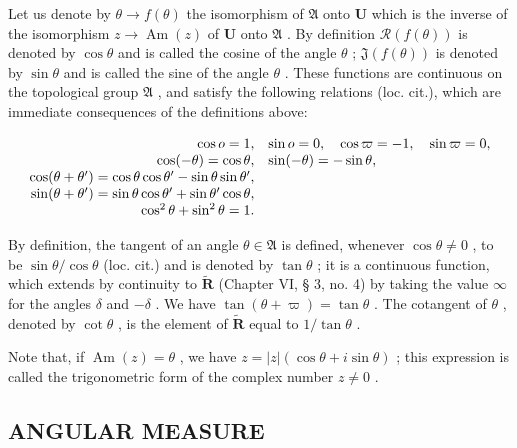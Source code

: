 Let us denote by \(\theta \to f(\theta)\) the isomorphism of \(\mathfrak{A}\) onto \(\mathbf{U}\) which is the inverse of the isomorphism \(z \to \operatorname{Am}(z)\) of \(\mathbf{U}\) onto \(\mathfrak{A}\) . By definition \(\mathcal{R}(f(\theta))\) is denoted by \(\cos \theta\) and is called the cosine of the angle \(\theta\) ; \(\mathfrak{J}(f(\theta))\) is denoted by \(\sin \theta\) and is called the sine of the angle \(\theta\) . These functions are continuous on the topological group \(\mathfrak{A}\) , and satisfy the following relations (loc. cit.), which are immediate consequences of the definitions above:

\[
\begin{array}{r l} \cos o = 1, & \sin o = 0, \quad \cos \varpi = - 1, \quad \sin \varpi = 0, \\ \cos (- \theta) = \cos \theta , & \sin (- \theta) = - \sin \theta , \\ \cos (\theta + \theta^ {\prime}) = \cos \theta \cos \theta^ {\prime} - \sin \theta \sin \theta^ {\prime}, \\ \sin (\theta + \theta^ {\prime}) = \sin \theta \cos \theta^ {\prime} + \sin \theta^ {\prime} \cos \theta , \\ \cos^ {2} \theta + \sin^ {2} \theta = 1. \end{array}
\]

By definition, the tangent of an angle \(\theta \in \mathfrak{A}\) is defined, whenever \(\cos \theta \neq 0\) , to be \(\sin \theta / \cos \theta\) (loc. cit.) and is denoted by \(\tan \theta\) ; it is a continuous function, which extends by continuity to \(\tilde{\mathbf{R}}\) (Chapter VI, § 3, no. 4) by taking the value \(\infty\) for the angles \(\delta\) and \(-\delta\) . We have \(\tan (\theta + \varpi) = \tan \theta\) . The cotangent of \(\theta\) , denoted by \(\cot \theta\) , is the element of \(\tilde{\mathbf{R}}\) equal to \(1 / \tan \theta\) .

Note that, if \(\operatorname{Am}(z) = \theta\) , we have \(z = |z| (\cos \theta + i \sin \theta)\) ; this expression is called the trigonometric form of the complex number \(z \neq 0\) .

\subsection{ANGULAR MEASURE}

